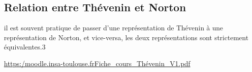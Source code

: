 \subsection{Relation entre Thévenin et Norton}
\begin{Todo}
il est souvent pratique de passer d'une représentation de Thévenin à une
représentation de Norton, et vice-versa, les deux représentations sont
strictement équivalentes.3

\href{https://moodle.insa-toulouse.fr/pluginfile.php/25823/mod_resource/content/1/Fiche_cours_Norton_V1.pdf}{https:\//moodle.insa-toulouse.fr\/Fiche\_cours\_Thévenin\_V1.pdf}
\end{Todo}
